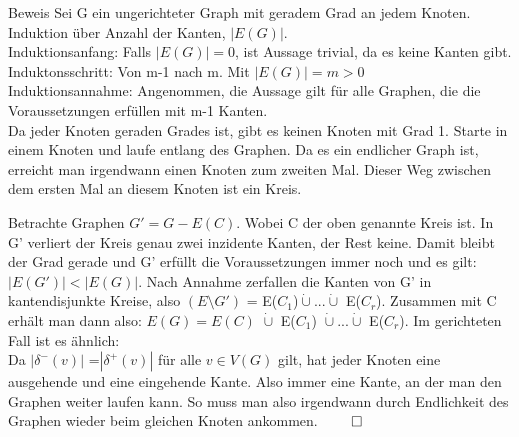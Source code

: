 \documentclass{beamer}
\begin{document}
    \begin{frame}
    \vfill
    \begin{center}
    \begin{block}{Beweis}
          Sei G ein ungerichteter Graph mit geradem Grad an jedem Knoten.
          Induktion über Anzahl der Kanten, $|E(G)|$.\\
          Induktionsanfang: Falls $|E(G)|=0$, ist Aussage trivial, da es keine Kanten gibt.\\
          Induktonsschritt: Von m-1 nach m. Mit $|E(G)|=m >0$\\
          Induktionsannahme: Angenommen, die Aussage gilt für alle Graphen, die die Voraussetzungen erfüllen mit m-1 Kanten.\\
          Da jeder Knoten geraden Grades ist, gibt es keinen Knoten mit Grad 1. Starte in einem Knoten und laufe entlang des Graphen. Da es ein endlicher Graph ist, erreicht man irgendwann einen Knoten zum zweiten Mal.
          Dieser Weg zwischen dem ersten Mal an diesem Knoten ist ein Kreis.
    \end{block}
    \end{center}
    \vfill
    \end{frame}

    \begin{frame}
    \vfill
      \begin{center}
      \begin{block}{}
          Betrachte Graphen $G'=G-E(C)$. Wobei C der oben genannte Kreis ist. 
          In G' verliert der Kreis genau zwei inzidente Kanten, der Rest keine.
          Damit bleibt der Grad gerade und G' erfüllt die Voraussetzungen immer noch und es gilt:\\
          $|E(G')|<|E(G)|$.
          Nach Annahme zerfallen die Kanten von G' in kantendisjunkte Kreise, also $(E\setminus G')$ = E($C_1$)$\dot\cup... \dot\cup$ E($C_r$).
          Zusammen mit C erhält man dann also: $E(G)=E(C)$ $\dot\cup$ E($C_1$) $\dot\cup...\dot\cup$ E($C_r$).
          Im gerichteten Fall ist es ähnlich:\\
          Da $|\delta ^-(v)|$ =$|\delta ^+(v)|$ für alle $v\in V(G)$ gilt, hat jeder Knoten eine ausgehende und eine eingehende Kante.
          Also immer eine Kante, an der man den Graphen weiter laufen kann. So muss man also irgendwann durch Endlichkeit des Graphen wieder beim gleichen Knoten ankommen. $\qed$
        \end{block}
    \end{center}
  \vfill
  \end{frame}
\end{document}
